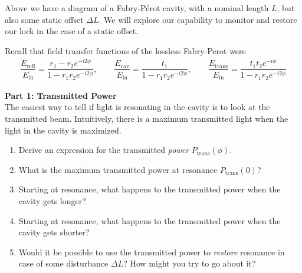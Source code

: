 \documentclass[11pt]{article}
\begin{document}
\begin{center}
\end{center}

Above we have a diagram of a Fabry-P\'erot cavity, 
with a nominal length $L$, but also some static offset $\Delta L$.
We will explore our capability to monitor and restore our lock in the case of a static offset.

Recall that field transfer functions of the lossless Fabry-Perot were 
\begin{align}
\dfrac{E_\mathrm{refl}}{E_\mathrm{in}} = \dfrac{r_1 - r_2 e^{-i 2 \phi}}{1 - r_1 r_2 e^{-i 2 \phi}}, \qquad
\dfrac{E_\mathrm{cav}}{E_\mathrm{in}} = \dfrac{t_1}{1 - r_1 r_2 e^{-i 2 \phi}}, \qquad
\dfrac{E_\mathrm{trans}}{E_\mathrm{in}} = \dfrac{t_1 t_2 e^{-i \phi}}{1 - r_1 r_2 e^{-i 2 \phi}}
\end{align}

\noindent
\textbf{Part 1: Transmitted Power}\\
The easiest way to tell if light is resonating in the cavity is to look at the transmitted beam.
Intuitively, there is a maximum transmitted light when the light in the cavity is maximized.

\begin{enumerate}
    \item Derive an expression for the transmitted \textit{power} $P_\mathrm{trans}(\phi)$.
    \item What is the maximum transmitted power at resonance $P_\mathrm{trans}(0)$?
    \item Starting at resonance, what happens to the transmitted power when the cavity gets longer?
    \item Starting at resonance, what happens to the transmitted power when the cavity gets shorter?
    \item Would it be possible to use the transmitted power to \textit{restore} resonance in case of some disturbance $\Delta L$?  How might you try to go about it?
\end{enumerate}
\end{document}
